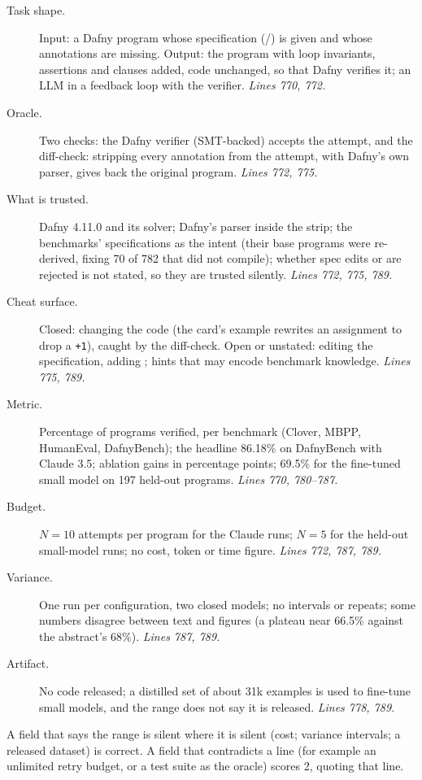 \documentclass[11pt]{article}
\begin{document}
\begin{description}
\item[Task shape.] Input: a Dafny program whose specification
  (/) is given and whose annotations are missing.
  Output: the program with loop invariants, assertions and 
  clauses added, code unchanged, so that Dafny verifies it; an LLM in a
  feedback loop with the verifier. \emph{Lines 770, 772.}
\item[Oracle.] Two checks: the Dafny verifier (SMT-backed) accepts the attempt,
  and the diff-check: stripping every annotation from the attempt, with Dafny's
  own parser, gives back the original program. \emph{Lines 772, 775.}
\item[What is trusted.] Dafny 4.11.0 and its solver; Dafny's parser inside the
  strip; the benchmarks' specifications as the intent (their base programs were
  re-derived, fixing 70 of 782 that did not compile); whether spec edits or
   are rejected is not stated, so they are trusted silently.
  \emph{Lines 772, 775, 789.}
\item[Cheat surface.] Closed: changing the code (the card's example rewrites an
  assignment to drop a \texttt{+1}), caught by the diff-check. Open or
  unstated: editing the specification, adding ; hints that may
  encode benchmark knowledge. \emph{Lines 775, 789.}
\item[Metric.] Percentage of programs verified, per benchmark (Clover, MBPP,
  HumanEval, DafnyBench); the headline 86.18\% on DafnyBench with Claude 3.5;
  ablation gains in percentage points; 69.5\% for the fine-tuned small model on
  197 held-out programs. \emph{Lines 770, 780--787.}
\item[Budget.] $N = 10$ attempts per program for the Claude runs; $N = 5$ for
  the held-out small-model runs; no cost, token or time figure.
  \emph{Lines 772, 787, 789.}
\item[Variance.] One run per configuration, two closed models; no intervals or
  repeats; some numbers disagree between text and figures (a plateau near
  66.5\% against the abstract's 68\%). \emph{Lines 787, 789.}
\item[Artifact.] No code released; a distilled set of about 31k examples is
  used to fine-tune small models, and the range does not say it is released.
  \emph{Lines 778, 789.}
\end{description}
A field that says the range is silent where it is silent (cost; variance
intervals; a released dataset) is correct. A field that contradicts a line
(for example an unlimited retry budget, or a test suite as the oracle) scores
2, quoting that line.
\end{document}
